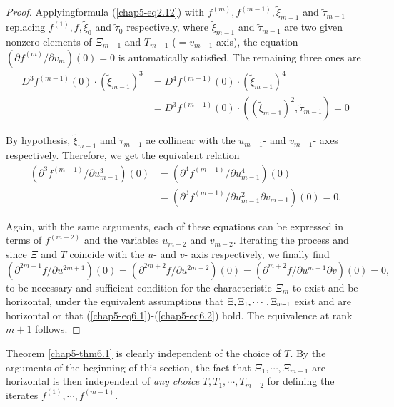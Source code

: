 \begin{proof}
Applying\pageoriginale formula (\ref{chap5-eq2.12}) with  $f^{(m)},
f^{(m-1)}, \widetilde{\xi}_{m-1}$ and $\widetilde{\tau}_{m-1}$
replacing $f^{(1)}, f, \widetilde{\xi}_{0}$ and $\widetilde{\tau}_{0}$
respectively, where $\widetilde{\xi}_{m-1}$ and
$\widetilde{\tau}_{m-1}$ are two given nonzero elements of $\Xi_{m-1}$
and $T_{m-1}$ ($= v_{m-1}$-axis), the equation\break $(\partial f^{(m)} /
\partial v_{m})(0) = 0$ is automatically satisfied. The remaining
three ones are
\begin{align*}
D^{3}f^{(m-1)} (0) \cdot (\widetilde{\xi}_{m-1})^{3} &=
D^{4}f^{(m-1)}(0) \cdot (\widetilde{\xi}_{m-1})^{4}\\ 
&=D^{3}f^{(m-1)}(0) \cdot ((\widetilde{\xi}_{m-1})^{2},
\widetilde{\tau}_{m-1}) = 0
\end{align*}

By hypothesis, $\widetilde{\xi}_{m-1}$ and $\widetilde{\tau}_{m-1}$ ae
collinear with the $u_{m-1}$- and $v_{m-1}$- axes
respectively. Therefore, we get the equivalent relation
\begin{align*}
(\partial^{3}f^{(m-1)} / \partial u_{m-1}^{3})(0) &=
(\partial^{4}f^{(m-1)}/ \partial u_{m-1}^{4})(0)\\ 
&=(\partial^{3}f^{(m-1)}/ \partial u_{m-1}^{2} \partial v_{m-1})(0) = 0.
\end{align*}

Again, with the same arguments, each of these equations can be
expressed in terms of $f^{(m-2)}$ and the variables $u_{m-2}$ and
$v_{m-2}$. Iterating the process and since $\Xi$ and $T$ coincide with
the $u$- and $v$- axis respectively, we finally find
$$
(\partial^{2m + 1}f/\partial u^{2m+1})(0) = (\partial^{2m+2}f/\partial
u^{2m+2})(0) = (\partial^{m+2}f/ \partial u^{m+1} \partial v)(0) = 0,
$$
to be necessary and sufficient condition for the characteristic
$\Xi_{m}$ to exist and be horizontal, under the equivalent assumptions
that $\Xi, \Xi_{1}, \cdots,\break \Xi_{m-1}$ exist and are horizontal or
that (\ref{chap5-eq6.1})-(\ref{chap5-eq6.2}) hold. The equivalence at
rank $m + 1$ follows.
\end{proof}

\begin{remark}\label{chap5-rem6.2}
Theorem \ref{chap5-thm6.1} is clearly independent of the choice
of $T$. By the arguments of the beginning of this section, the fact that
$\Xi_{1}, \cdots, \Xi_{m-1}$ are horizontal is then independent of
{\em any choice} $T, T_{1}, \cdots, T_{m-2}$ for defining the iterates
$f^{(1)}, \cdots, f^{(m-1)}$.
\end{remark}


